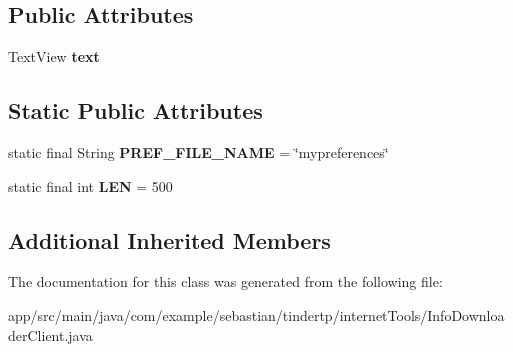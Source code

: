 \subsection*{Public Attributes}
\begin{DoxyCompactItemize}
\item 
Text\+View {\bfseries text}\hypertarget{classcom_1_1example_1_1sebastian_1_1tindertp_1_1internetTools_1_1InfoDownloaderClient_af7bc063a43057f8926845d9d0b636ca6}{}\label{classcom_1_1example_1_1sebastian_1_1tindertp_1_1internetTools_1_1InfoDownloaderClient_af7bc063a43057f8926845d9d0b636ca6}

\end{DoxyCompactItemize}
\subsection*{Static Public Attributes}
\begin{DoxyCompactItemize}
\item 
static final String {\bfseries P\+R\+E\+F\+\_\+\+F\+I\+L\+E\+\_\+\+N\+A\+ME} = \char`\"{}mypreferences\char`\"{}\hypertarget{classcom_1_1example_1_1sebastian_1_1tindertp_1_1internetTools_1_1InfoDownloaderClient_a607f016306efd00062d12f89d3ff7ca7}{}\label{classcom_1_1example_1_1sebastian_1_1tindertp_1_1internetTools_1_1InfoDownloaderClient_a607f016306efd00062d12f89d3ff7ca7}

\item 
static final int {\bfseries L\+EN} = 500\hypertarget{classcom_1_1example_1_1sebastian_1_1tindertp_1_1internetTools_1_1InfoDownloaderClient_acd2749e280428f498c4688105a0b3c82}{}\label{classcom_1_1example_1_1sebastian_1_1tindertp_1_1internetTools_1_1InfoDownloaderClient_acd2749e280428f498c4688105a0b3c82}

\end{DoxyCompactItemize}
\subsection*{Additional Inherited Members}


The documentation for this class was generated from the following file\+:\begin{DoxyCompactItemize}
\item 
app/src/main/java/com/example/sebastian/tindertp/internet\+Tools/Info\+Downloader\+Client.\+java\end{DoxyCompactItemize}
